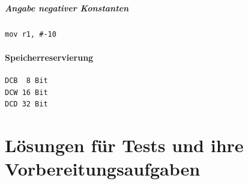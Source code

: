 \documentclass[12pt,a4paper]{scrartcl}
\begin{document}
\subparagraph{Angabe negativer Konstanten}
\begin{lstlisting}
mov r1, #-10
\end{lstlisting}

\paragraph{Speicherreservierung}
\begin{lstlisting}
DCB  8 Bit
DCW 16 Bit
DCD 32 Bit
\end{lstlisting}

\newpage
\section*{Lösungen für Tests und ihre Vorbereitungsaufgaben}

\newpage

\newpage


\newpage

\end{document}
